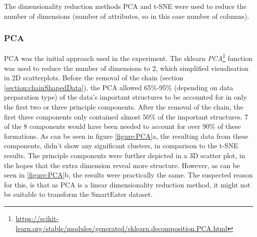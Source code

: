 
The dimensionality reduction methods PCA and t-SNE were used to reduce the number of dimensions (number of attributes, so in this case number of columns). 

\subsubsection{PCA}
PCA was the initial approach used in the experiment. The sklearn \textit{PCA}\footnote{\url{https://scikit-learn.org/stable/modules/generated/sklearn.decomposition.PCA.html}} function was used to reduce the number of dimensions to 2, which simplified visualisation in 2D scatterplots. Before the removal of the chain (section \ref{section:chainShapedData}), the PCA allowed 65\%-95\% (depending on data preparation type) of the data's important structures to be accounted for in only the first two or three principle components. After the removal of the chain, the first three components only contained almost 50\% of the important structures. 7 of the 8 components would have been needed to account for over 90\% of these formations. As can be seen in figure \ref{figure:PCA}a, the resulting data from these components, didn't show any significant clusters, in comparison to the t-SNE results. The principle components were further depicted in a 3D scatter plot, in the hopes that the extra dimension reveal more structure. However, as can be seen in \ref{figure:PCA}b, the results were practically the same. The suspected reason for this, is that as PCA is a linear dimensionality reduction method, it might not be suitable to transform the SmartEater dataset.


